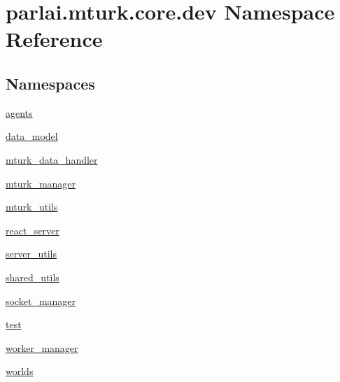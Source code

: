 \hypertarget{namespaceparlai_1_1mturk_1_1core_1_1dev}{}\section{parlai.\+mturk.\+core.\+dev Namespace Reference}
\label{namespaceparlai_1_1mturk_1_1core_1_1dev}
\subsection*{Namespaces}
\begin{DoxyCompactItemize}
\item 
 \hyperlink{namespaceparlai_1_1mturk_1_1core_1_1dev_1_1agents}{agents}
\item 
 \hyperlink{namespaceparlai_1_1mturk_1_1core_1_1dev_1_1data__model}{data\+\_\+model}
\item 
 \hyperlink{namespaceparlai_1_1mturk_1_1core_1_1dev_1_1mturk__data__handler}{mturk\+\_\+data\+\_\+handler}
\item 
 \hyperlink{namespaceparlai_1_1mturk_1_1core_1_1dev_1_1mturk__manager}{mturk\+\_\+manager}
\item 
 \hyperlink{namespaceparlai_1_1mturk_1_1core_1_1dev_1_1mturk__utils}{mturk\+\_\+utils}
\item 
 \hyperlink{namespaceparlai_1_1mturk_1_1core_1_1dev_1_1react__server}{react\+\_\+server}
\item 
 \hyperlink{namespaceparlai_1_1mturk_1_1core_1_1dev_1_1server__utils}{server\+\_\+utils}
\item 
 \hyperlink{namespaceparlai_1_1mturk_1_1core_1_1dev_1_1shared__utils}{shared\+\_\+utils}
\item 
 \hyperlink{namespaceparlai_1_1mturk_1_1core_1_1dev_1_1socket__manager}{socket\+\_\+manager}
\item 
 \hyperlink{namespaceparlai_1_1mturk_1_1core_1_1dev_1_1test}{test}
\item 
 \hyperlink{namespaceparlai_1_1mturk_1_1core_1_1dev_1_1worker__manager}{worker\+\_\+manager}
\item 
 \hyperlink{namespaceparlai_1_1mturk_1_1core_1_1dev_1_1worlds}{worlds}
\end{DoxyCompactItemize}
